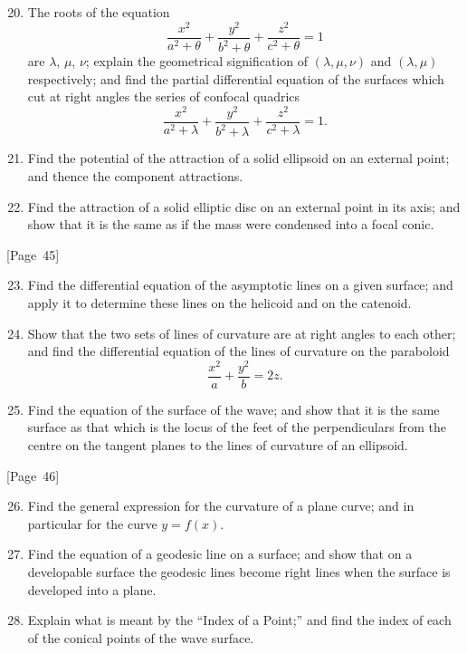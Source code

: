 \documentclass[11pt,a4paper]{book}
\begin{document}
\begin{enumerate}
\setcounter{enumi}{19}
\item The roots of the equation
\[
\frac{x^2}{a^2+\theta} + \frac{y^2}{b^2+\theta} + \frac{z^2}{c^2+\theta} = 1
\]
are $\lambda$, $\mu$, $\nu$; explain the geometrical signification of
$(\lambda,\mu,\nu)$ and $(\lambda,\mu)$ respectively; and find the
partial differential equation of the surfaces which cut at right angles
the series of confocal quadrics
\[
\frac{x^2}{a^2+\lambda} + \frac{y^2}{b^2+\lambda} + \frac{z^2}{c^2+\lambda} = 1.
\]

\item Find the potential of the attraction of a solid ellipsoid on an
external point; and thence the component attractions.

\item Find the attraction of a solid elliptic disc on an external
point in its axis; and show that it is the same as if the mass were
condensed into a focal conic.
\end{enumerate}

\begin{center}
[Page~45]
\end{center}

\begin{enumerate}
\setcounter{enumi}{22}
\item Find the differential equation of the asymptotic lines on a
given surface; and apply it to determine these lines on the helicoid
and on the catenoid.

\item Show that the two sets of lines of curvature are at right angles
to each other; and find the differential equation of the lines of
curvature on the paraboloid
\[
\frac{x^2}{a} + \frac{y^2}{b} = 2z.
\]

\item Find the equation of the surface of the wave; and show that it
is the same surface as that which is the locus of the feet of the
perpendiculars from the centre on the tangent planes to the lines of
curvature of an ellipsoid.
\end{enumerate}

\begin{center}
[Page~46]
\end{center}

\begin{enumerate}
\setcounter{enumi}{25}
\item Find the general expression for the curvature of a plane curve;
and in particular for the curve $y = f(x)$.

\item Find the equation of a geodesic line on a surface; and show that
on a developable surface the geodesic lines become right lines when the
surface is developed into a plane.

\item Explain what is meant by the ``Index of a Point;'' and find the
index of each of the conical points of the wave surface.
\end{enumerate}
\end{document}
